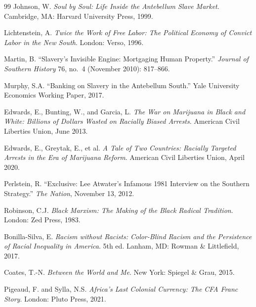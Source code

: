 \documentclass[12pt,openany]{book}
\begin{document}
\begin{thebibliography}{99}
Johnson, W. \textit{Soul by Soul: Life Inside the Antebellum Slave Market}. Cambridge, MA: Harvard University Press, 1999.


Lichtenstein, A. \textit{Twice the Work of Free Labor: The Political Economy of Convict Labor in the New South}. London: Verso, 1996.


Martin, B. ``Slavery's Invisible Engine: Mortgaging Human Property.'' \textit{Journal of Southern History} 76, no.\ 4 (November 2010): 817--866.

Murphy, S.A. ``Banking on Slavery in the Antebellum South.'' Yale University Economics Working Paper, 2017.


Edwards, E., Bunting, W., and Garcia, L. \textit{The War on Marijuana in Black and White: Billions of Dollars Wasted on Racially Biased Arrests}. American Civil Liberties Union, June 2013.

Edwards, E., Greytak, E., et al. \textit{A Tale of Two Countries: Racially Targeted Arrests in the Era of Marijuana Reform}. American Civil Liberties Union, April 2020.


Perlstein, R. ``Exclusive: Lee Atwater's Infamous 1981 Interview on the Southern Strategy.'' \textit{The Nation}, November 13, 2012.


Robinson, C.J. \textit{Black Marxism: The Making of the Black Radical Tradition}. London: Zed Press, 1983.

Bonilla-Silva, E. \textit{Racism without Racists: Color-Blind Racism and the Persistence of Racial Inequality in America}. 5th ed. Lanham, MD: Rowman \& Littlefield, 2017.

Coates, T.-N. \textit{Between the World and Me}. New York: Spiegel \& Grau, 2015.


Pigeaud, F. and Sylla, N.S. \textit{Africa's Last Colonial Currency: The CFA Franc Story}. London: Pluto Press, 2021.


\end{thebibliography}
\end{document}
